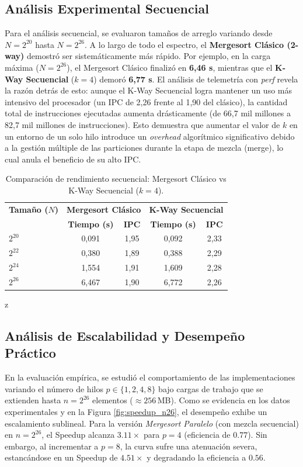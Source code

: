 \documentclass[12pt, a4paper]{article}
\begin{document}
\subsection{Análisis Experimental Secuencial}
Para el análisis secuencial, se evaluaron tamaños de arreglo variando desde $N=2^{20}$ hasta $N=2^{26}$. A lo largo de todo el espectro, el \textbf{Mergesort Clásico (2-way)} demostró ser sistemáticamente más rápido. Por ejemplo, en la carga máxima ($N=2^{26}$), el Mergesort Clásico finalizó en \textbf{6,46 s}, 
mientras que el \textbf{K-Way Secuencial} ($k=4$) demoró \textbf{6,77 s}.
El análisis de telemetría con \textit{perf} revela la razón detrás de esto: aunque el K-Way Secuencial logra mantener un uso más intensivo del procesador (un IPC de 2,26 frente al 1,90 del clásico), 
la cantidad total de instrucciones ejecutadas aumenta drásticamente (de 66,7 mil millones a 82,7 mil millones de instrucciones). 
Esto demuestra que aumentar el valor de $k$ en un entorno de un solo hilo introduce un 
\textit{overhead} algorítmico significativo debido a la gestión múltiple de las particiones durante la etapa de mezcla (merge),
lo cual anula el beneficio de su alto IPC.

\begin{table}[h]
\centering
\caption{Comparación de rendimiento secuencial: Mergesort Clásico vs K-Way Secuencial ($k=4$).}
\vspace{0.2cm}
\begin{tabular}{l|cc|cc}
\hline
\textbf{Tamaño ($N$)} & \multicolumn{2}{c|}{\textbf{Mergesort Clásico}} & \multicolumn{2}{c}{\textbf{K-Way Secuencial}} \\ 
 & \textbf{Tiempo (s)} & \textbf{IPC} & \textbf{Tiempo (s)} & \textbf{IPC} \\ \hline
$2^{20}$ & 0,091 & 1,95 & 0,092 & 2,33 \\
$2^{22}$ & 0,380 & 1,89 & 0,388 & 2,29 \\
$2^{24}$ & 1,554 & 1,91 & 1,609 & 2,28 \\
$2^{26}$ & 6,467 & 1,90 & 6,772 & 2,26 \\ \hline
\end{tabular}
\label{tab:secuenciales}
\end{table}z

\subsection{Análisis de Escalabilidad y Desempeño Práctico}
En la evaluación empírica, se estudió el comportamiento de las implementaciones variando el número de hilos $p \in \{1, 2, 4, 8\}$ bajo cargas de trabajo que se extienden hasta $n = 2^{26}$ elementos ($\approx 256$\,MB). 
Como se evidencia en los datos experimentales y en la Figura \ref{fig:speedup_n26}, el desempeño exhibe un escalamiento sublineal. 
Para la versión \textit{Mergesort Paralelo} (con mezcla secuencial) en $n=2^{26}$, el Speedup alcanza $3.11\times$ para $p=4$ (eficiencia de $0.77$). 
Sin embargo, al incrementar a $p=8$, la curva sufre una atenuación severa, estancándose en un Speedup de $4.51\times$ y degradando la eficiencia a $0.56$. 
\end{document}
